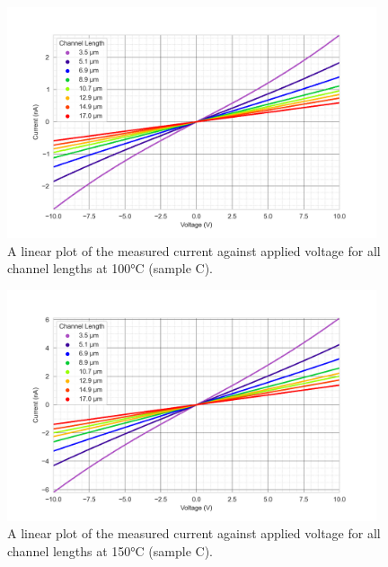 \begin{figure}[h]
    \centering
    \includegraphics[width=0.97\textwidth]{Chapter3/Figs/Raster/Sample C 2019/IV/10V IV characteristics at 100 C.png}
    \caption{A linear plot of the measured current against applied voltage for all channel lengths at 100\si{\degreeCelsius} (sample C).}
    \label{appfig:C_current_voltage_100}
\end{figure}
\begin{figure}[h]
    \centering
    \includegraphics[width=0.97\textwidth]{Chapter3/Figs/Raster/Sample C 2019/IV/10V IV characteristics at 150 C.png}
    \caption{A linear plot of the measured current against applied voltage for all channel lengths at 150\si{\degreeCelsius} (sample C).}
    \label{appfig:C_current_voltage_150}
\end{figure}
